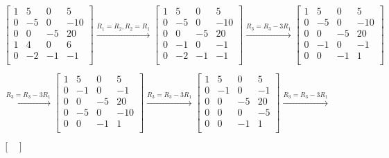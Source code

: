 \documentclass[fleqn]{article}
\begin{document}
\begin{multline*}
  \begin{bmatrix}
    1 &  5 &  0 &  5 \\
    0 & -5 &  0 & -10 \\
    0 &  0 & -5 &  20 \\
    1 &  4 &  0 &  6 \\
    0 & -2 & -1 & -1 \\
  \end{bmatrix}
  \xrightarrow{R_1 = R_2, R_2 = R_1}
  \begin{bmatrix}
    1 &  5 &  0 &  5 \\
    0 & -5 &  0 & -10 \\
    0 &  0 & -5 &  20 \\
    0 & -1 &  0 & -1 \\
    0 & -2 & -1 & -1 \\
  \end{bmatrix}
  \xrightarrow{R_3 = R_3 - 3R_1}
  \begin{bmatrix}
    1 &  5 &  0 &  5 \\
    0 & -5 &  0 & -10 \\
    0 &  0 & -5 &  20 \\
    0 & -1 &  0 & -1 \\
    0 &  0 & -1 &  1 \\
  \end{bmatrix} \\ \\
  \xrightarrow{R_3 = R_3 - 3R_1}
  \begin{bmatrix}
    1 &  5 &  0 &  5 \\
    0 & -1 &  0 & -1 \\
    0 &  0 & -5 &  20 \\
    0 & -5 &  0 & -10 \\
    0 &  0 & -1 &  1 \\
  \end{bmatrix}
  \xrightarrow{R_3 = R_3 - 3R_1}
  \begin{bmatrix}
    1 &  5 &  0 &  5 \\
    0 & -1 &  0 & -1 \\
    0 &  0 & -5 &  20 \\
    0 &  0 &  0 & -5 \\
    0 &  0 & -1 &  1 \\
  \end{bmatrix}
  \xrightarrow{R_3 = R_3 - 3R_1} \\ \\
  \begin{bmatrix}

\end{bmatrix}
\end{multline*}
\end{document}
